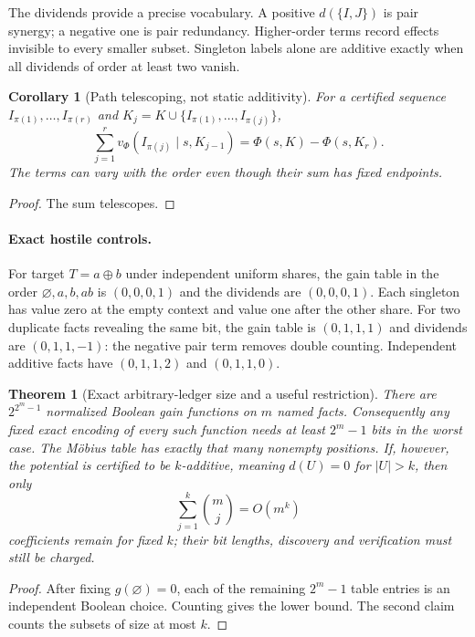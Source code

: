 \documentclass[11pt]{article}
\newtheorem{theorem}{Theorem}
\newtheorem{corollary}{Corollary}
\begin{document}
The dividends provide a precise vocabulary.  A positive $d(\{I,J\})$ is
pair synergy; a negative one is pair redundancy.  Higher-order terms record
effects invisible to every smaller subset.  Singleton labels alone are
additive exactly when all dividends of order at least two vanish.

\begin{corollary}[Path telescoping, not static additivity]
For a certified sequence $I_{\pi(1)},\dots,I_{\pi(r)}$ and
$K_j=K\cup\{I_{\pi(1)},\dots,I_{\pi(j)}\}$,
\[
 \sum_{j=1}^r v_\Phi(I_{\pi(j)}\mid s,K_{j-1})
 =\Phi(s,K)-\Phi(s,K_r).
\]
The terms can vary with the order even though their sum has fixed endpoints.
\end{corollary}
\begin{proof}The sum telescopes.\end{proof}

\paragraph{Exact hostile controls.}
For target $T=a\oplus b$ under independent uniform shares, the gain table in
the order $\varnothing,a,b,ab$ is $(0,0,0,1)$ and the dividends are
$(0,0,0,1)$.  Each singleton has value zero at the empty context and value one
after the other share.  For two duplicate facts revealing the same bit, the
gain table is $(0,1,1,1)$ and dividends are $(0,1,1,-1)$: the negative pair
term removes double counting.  Independent additive facts have
$(0,1,1,2)$ and $(0,1,1,0)$.

\begin{theorem}[Exact arbitrary-ledger size and a useful restriction]
There are $2^{2^m-1}$ normalized Boolean gain functions on $m$ named facts.
Consequently any fixed exact encoding of every such function needs at least
$2^m-1$ bits in the worst case.  The M\"obius table has exactly that many
nonempty positions.  If, however, the potential is certified to be
$k$-additive, meaning $d(U)=0$ for $|U|>k$, then only
\[
 \sum_{j=1}^{k}\binom mj=O(m^k)
\]
coefficients remain for fixed $k$; their bit lengths, discovery and
verification must still be charged.
\end{theorem}
\begin{proof}
After fixing $g(\varnothing)=0$, each of the remaining $2^m-1$ table entries is
an independent Boolean choice.  Counting gives the lower bound.  The second
claim counts the subsets of size at most $k$.
\end{proof}
\end{document}

